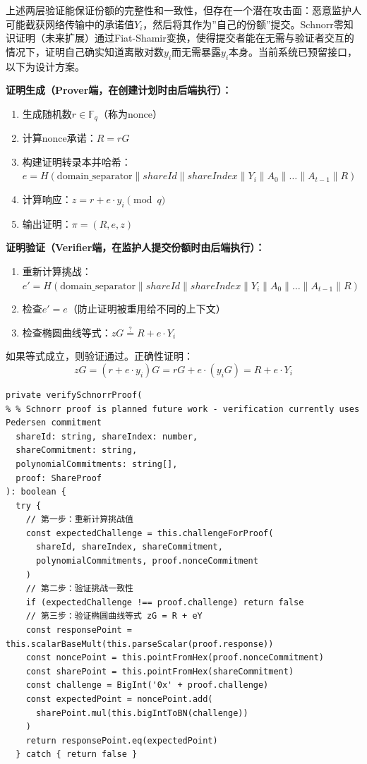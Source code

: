 \documentclass[UTF8,a4paper,zihao=-4,openany]{ctexrep}
\begin{document}
上述两层验证能保证份额的完整性和一致性，但存在一个潜在攻击面：恶意监护人可能截获网络传输中的承诺值$Y_i$，然后将其作为”自己的份额”提交。Schnorr零知识证明（未来扩展）通过Fiat-Shamir变换，使得提交者能在无需与验证者交互的情况下，证明自己确实知道离散对数$y_i$而无需暴露$y_i$本身。当前系统已预留接口，以下为设计方案。

\textbf{证明生成（Prover端，在创建计划时由后端执行）：}

\begin{enumerate}
  \item 生成随机数$r \in \mathbb{F}_q$（称为nonce）
  \item 计算nonce承诺：$R = rG$
  \item 构建证明转录本并哈希：$e = H(\text{domain\_separator} \| shareId \| shareIndex \| Y_i \| A_0 \| \dots \| A_{t-1} \| R)$
  \item 计算响应：$z = r + e \cdot y_i \pmod{q}$
  \item 输出证明：$\pi = (R, e, z)$
\end{enumerate}

\textbf{证明验证（Verifier端，在监护人提交份额时由后端执行）：}

\begin{enumerate}
  \item 重新计算挑战：$e' = H(\text{domain\_separator} \| shareId \| shareIndex \| Y_i \| A_0 \| \dots \| A_{t-1} \| R)$
  \item 检查$e' = e$（防止证明被重用给不同的上下文）
  \item 检查椭圆曲线等式：$zG \stackrel{?}{=} R + e \cdot Y_i$
\end{enumerate}

如果等式成立，则验证通过。正确性证明：
\[
zG = (r + e \cdot y_i)G = rG + e \cdot (y_iG) = R + e \cdot Y_i
\]

\begin{lstlisting}[caption={Pedersen承诺验证实现 (shamir.ts:190-220)}]
private verifySchnorrProof(
% % Schnorr proof is planned future work - verification currently uses Pedersen commitment
  shareId: string, shareIndex: number,
  shareCommitment: string,
  polynomialCommitments: string[],
  proof: ShareProof
): boolean {
  try {
    // 第一步：重新计算挑战值
    const expectedChallenge = this.challengeForProof(
      shareId, shareIndex, shareCommitment,
      polynomialCommitments, proof.nonceCommitment
    )
    // 第二步：验证挑战一致性
    if (expectedChallenge !== proof.challenge) return false
    // 第三步：验证椭圆曲线等式 zG = R + eY
    const responsePoint = this.scalarBaseMult(this.parseScalar(proof.response))
    const noncePoint = this.pointFromHex(proof.nonceCommitment)
    const sharePoint = this.pointFromHex(shareCommitment)
    const challenge = BigInt('0x' + proof.challenge)
    const expectedPoint = noncePoint.add(
      sharePoint.mul(this.bigIntToBN(challenge))
    )
    return responsePoint.eq(expectedPoint)
  } catch { return false }
\end{lstlisting}
\end{document}
